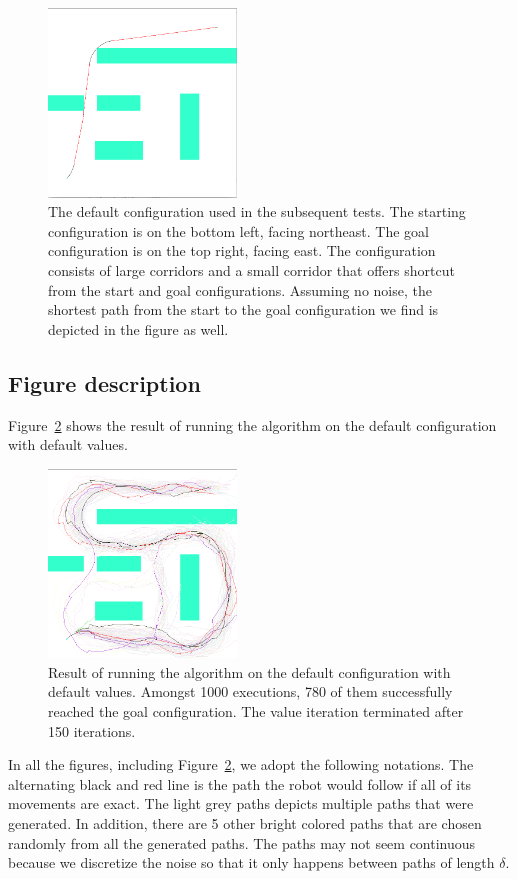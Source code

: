 \documentclass[a4paper]{article}
\begin{document}
\begin{figure}
\label{f:b}
\caption{The default configuration used in the subsequent tests. The starting
  configuration is on the bottom left, facing northeast. The goal configuration
  is on the top right, facing east. The configuration consists
  of large corridors and a small corridor that offers shortcut from the start
  and goal configurations. Assuming no noise, the shortest path from the start
to the goal configuration we find is depicted in the figure as well.}
\centerline{\includegraphics[width=5cm]{b_shortest.png}}
\end{figure}

\subsection{Figure description}
Figure~\ref{f:b} shows the result of running the algorithm on the default
configuration with default values.

\begin{figure}
\label{f:b}
\caption{Result of running the algorithm on the default configuration with default values.
Amongst 1000 executions, 780 of them successfully reached the goal configuration.
The value iteration terminated after 150 iterations.}
\centerline{\includegraphics[width=5cm]{b.png}}
\end{figure}

In all the figures, including Figure~\ref{f:b}, we adopt the following notations.
The alternating black and red line is the path the robot would follow if
all of its movements are exact. The light grey paths depicts multiple paths
that were generated. In addition, there are 5 other bright colored paths that
are chosen randomly from all the generated paths. The paths may not seem continuous
because we discretize the noise so that it only happens between paths of length
$\delta$.
\end{document}
